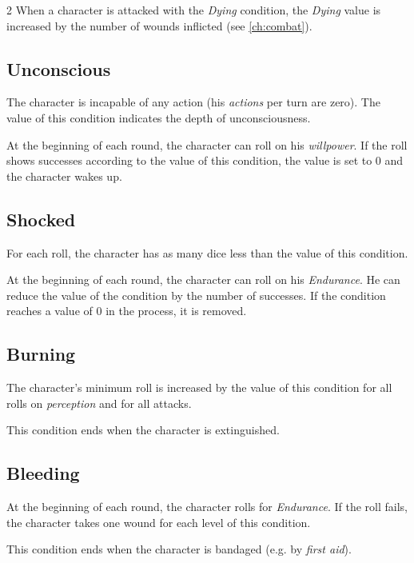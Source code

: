 \begin{multicols}{2}
When a character is attacked with the \textit{Dying} condition, the \textit{Dying} value is increased by the number of wounds inflicted (see \cref{ch:combat}).

\subsection{Unconscious}

The character is incapable of any action (his \textit{actions} per turn are zero). The value of this condition indicates the depth of unconsciousness.

At the beginning of each round, the character can roll on his \textit{willpower}. If the roll shows successes according to the value of this condition, the value is set to 0 and the character wakes up.

\subsection{Shocked}

For each roll, the character has as many dice less than the value of this condition.

At the beginning of each round, the character can roll on his \textit{Endurance}. He can reduce the value of the condition by the number of successes. If the condition reaches a value of 0 in the process, it is removed.

\subsection{Burning}

The character's minimum roll is increased by the value of this condition for all rolls on \textit{perception} and for all attacks.

This condition ends when the character is extinguished.

\subsection{Bleeding}

At the beginning of each round, the character rolls for \textit{Endurance}. If the roll fails, the character takes one wound for each level of this condition.

This condition ends when the character is bandaged (e.g. by \textit{first aid}).


\end{multicols}
